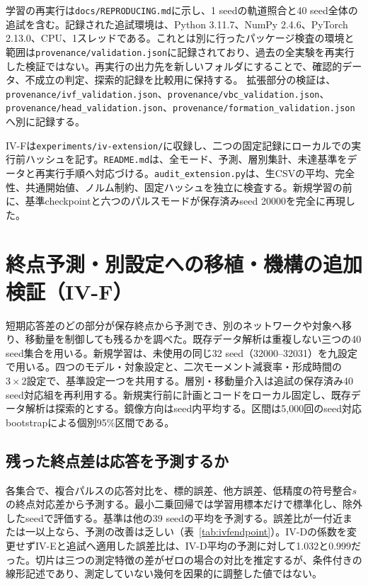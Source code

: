 学習の再実行は\texttt{docs/REPRODUCING.md}に示し、1 seedの軌道照合と40 seed全体の追試を含む。記録された追試環境は、Python 3.11.7、NumPy 2.4.6、PyTorch 2.13.0、CPU、1スレッドである。これとは別に行ったパッケージ検査の環境と範囲は\texttt{provenance/validation.json}に記録されており、過去の全実験を再実行した検証ではない。再実行の出力先を新しいフォルダにすることで、確認的データ、不成立の判定、探索的記録を比較用に保持する。 拡張部分の検証は、\texttt{provenance/ivf\_validation.json}、\texttt{provenance/vbc\_validation.json}、\texttt{provenance/head\_validation.json}、\texttt{provenance/formation\_validation.json}へ別に記録する。

IV-Fは\texttt{experiments/iv-extension/}に収録し、二つの固定記録にローカルでの実行前ハッシュを記す。\texttt{README.md}は、全モード、予測、層別集計、未達基準をデータと再実行手順へ対応づける。\texttt{audit\_extension.py}は、生CSVの平均、完全性、共通開始値、ノルム制約、固定ハッシュを独立に検査する。新規学習の前に、基準checkpointと六つのパルスモードが保存済みseed 20000を完全に再現した。

\section{終点予測・別設定への移植・機構の追加検証（IV-F）}
\label{app:extension}
短期応答差のどの部分が保存終点から予測でき、別のネットワークや対象へ移り、移動量を制御しても残るかを調べた。既存データ解析は重複しない三つの40 seed集合を用いる。新規学習は、未使用の同じ32 seed（32000--32031）を九設定で用いる。四つのモデル・対象設定と、二次モーメント減衰率・形成時間の$3\times2$設定で、基準設定一つを共用する。層別・移動量介入は追試の保存済み40 seed対応組を再利用する。新規実行前に計画とコードをローカル固定し、既存データ解析は探索的とする。鏡像方向はseed内平均する。区間は5,000回のseed対応bootstrapによる個別95\%区間である。

\subsection{残った終点差は応答を予測するか}
各集合で、複合パルスの応答対比を、標的誤差、他方誤差、低精度の符号整合$s$の終点対応差から予測する。最小二乗回帰では学習用標本だけで標準化し、除外したseedで評価する。基準は他の39 seedの平均を予測する。誤差比が一付近または一以上なら、予測の改善は乏しい（表~\ref{tab:ivfendpoint}）。IV-Dの係数を変更せずIV-Eと追試へ適用した誤差比は、IV-D平均の予測に対して1.032と0.999だった。切片は三つの測定特徴の差がゼロの場合の対比を推定するが、条件付きの線形記述であり、測定していない幾何を因果的に調整した値ではない。


